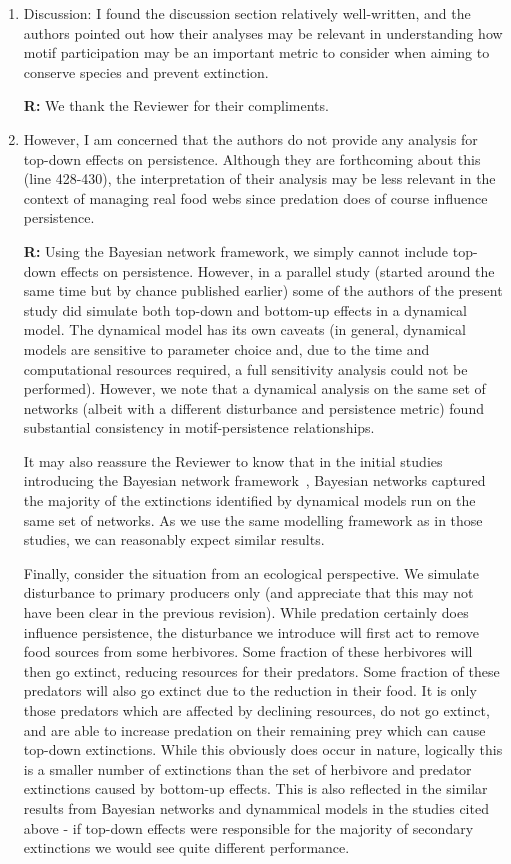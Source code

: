 \documentclass[12pt]{article}
\begin{document}
\begin{enumerate}
            \item Discussion: I found the discussion section relatively well-written, and the authors pointed out how their analyses may be relevant in understanding how motif participation may be an important metric to consider when aiming to conserve species and prevent extinction.

                \textbf{R:} We thank the Reviewer for their compliments.


            \item However, I am concerned that the authors do not provide any analysis for top-down effects on persistence. Although they are forthcoming about this (line 428-430), the interpretation of their analysis may be less relevant in the context of managing real food webs since predation does of course influence persistence.

                \textbf{R:} Using the Bayesian network framework, we simply cannot include top-down effects on persistence. However, in a parallel study (started around the same time but by chance published earlier) some of the authors of the present study did simulate both top-down and bottom-up effects in a dynamical model. The dynamical model has its own caveats (in general, dynamical models are sensitive to parameter choice and, due to the time and computational resources required, a full sensitivity analysis could not be performed). However, we note that a dynamical analysis on the same set of networks (albeit with a different disturbance and persistence metric) found substantial consistency in motif-persistence relationships.


                It may also reassure the Reviewer to know that in the initial studies introducing the Bayesian network framework~\citep{Eklof2013}, Bayesian networks captured the majority of the extinctions identified by dynamical models run on the same set of networks. As we use the same modelling framework as in those studies, we can reasonably expect similar results.


                Finally, consider the situation from an ecological perspective. We simulate disturbance to primary producers only (and appreciate that this may not have been clear in the previous revision). While predation certainly does influence persistence, the disturbance we introduce will first act to remove food sources from some herbivores. Some fraction of these herbivores will then go extinct, reducing resources for their predators. Some fraction of these predators will also go extinct due to the reduction in their food. It is only those predators which are affected by declining resources, do not go extinct, and are able to increase predation on their remaining prey which can cause top-down extinctions. While this obviously does occur in nature, logically this is a smaller number of extinctions than the set of herbivore and predator extinctions caused by bottom-up effects. This is also reflected in the similar results from Bayesian networks and dynammical models in the studies cited above - if top-down effects were responsible for the majority of secondary extinctions we would see quite different performance.



\end{enumerate}
\end{document}

